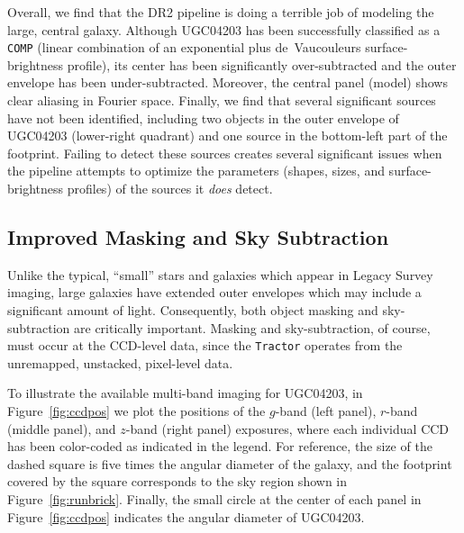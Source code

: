 Overall, we find that the DR2 pipeline is doing a terrible job of modeling the
large, central galaxy.  Although UGC04203 has been successfully classified as a
{\tt COMP} (linear combination of an exponential plus de~Vaucouleurs
surface-brightness profile), its center has been significantly over-subtracted
and the outer envelope has been under-subtracted.  Moreover, the central panel
(model) shows clear aliasing in Fourier space.  Finally, we find that several
significant sources have not been identified, including two objects in the outer
envelope of UGC04203 (lower-right quadrant) and one source in the bottom-left
part of the footprint.  Failing to detect these sources creates several
significant issues when the pipeline attempts to optimize the parameters
(shapes, sizes, and surface-brightness profiles) of the sources it \emph{does}
detect.

\subsection{Improved Masking and Sky Subtraction}\label{sec:sky}

Unlike the typical, ``small'' stars and galaxies which appear in Legacy Survey
imaging, large galaxies have extended outer envelopes which may include a
significant amount of light.  Consequently, both object masking and
sky-subtraction are critically important.  Masking and sky-subtraction, of
course, must occur at the CCD-level data, since the {\tt Tractor} operates from
the unremapped, unstacked, pixel-level data.

To illustrate the available multi-band imaging for UGC04203, in
Figure~\ref{fig:ccdpos} we plot the positions of the $g$-band (left panel),
$r$-band (middle panel), and $z$-band (right panel) exposures, where each
individual CCD has been color-coded as indicated in the legend.  For reference,
the size of the dashed square is five times the angular diameter of the galaxy,
and the footprint covered by the square corresponds to the sky region shown in
Figure~\ref{fig:runbrick}.  Finally, the small circle at the center of each
panel in Figure~\ref{fig:ccdpos} indicates the angular diameter of UGC04203.



